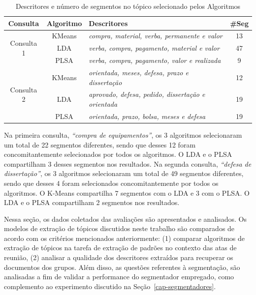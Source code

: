 \begin{table}[!h]
\begin{tabular}{|c|c|l|c|}
 \hline 
 \textbf{Consulta} &\textbf{Algoritmo }& \textbf{Descritores }& \textbf{\#Seg} \\ \hline
 \multirow{3}{*}{Consulta 1} &
 KMeans & \textit{compra, material, verba, permanente e valor} & 13 \\  \cline{2-4} 
 & LDA    & \textit{verba, compra, pagamento, material e valor}  & 47 \\  \cline{2-4}
 & PLSA   & \textit{verba, compra, pagamento, valor e realizada} & 9  \\  \hline 
 \multirow{3}{*}{Consulta 2} &
 KMeans & \textit{orientada, meses, defesa, prazo e dissertação} & 12 \\  \cline{2-4}
 & LDA    & \textit{aprovado, defesa, pedido, dissertação e orientada} & 19 \\ \cline{2-4} 
 & PLSA   & \textit{orientada, prazo, bolsa, meses e defesa} & 19 \\  \hline 
 \end{tabular}  
 \label{tab:segquanti}
 \caption{Descritores e número de segmentos no tópico selecionado pelos Algoritmos}
\end{table} 

Na primeira consulta, \textit{``compra de equipamentos''},  os 3 algoritmos selecionaram um total de 22 segmentos diferentes, sendo que desses 12 foram concomitantemente selecionados por todos os algoritmos. O LDA e o PLSA compartilham 3 desses segmentos nos resultados.
Na segunda  consulta, \textit{``defesa de dissertação''}, os 3 algoritmos selecionaram um total de 49 segmentos diferentes, sendo que desses 4 foram selecionados concomitantemente por todos os algoritmos. O K-Means compartilha 7 segmentos com o LDA e 3 com o PLSA. O LDA e o PLSA compartilham 2 segmentos nos resultados.



Nessa seção, os dados coletados das avaliações são apresentados e analisados. Os modelos de extração de tópicos discutidos neste trabalho são comparados de acordo com os critérios mencionados anteriormente: 
(1) comparar algoritmos de extração de tópicos na tarefa de extração de padrões no contexto das atas de reunião, 
(2) analisar a qualidade dos descritores extraídos para recuperar os documentos dos grupos.
Além disso, as questões referentes à segmentação, são analisadas a fim de 
validar a performance do segmentador empregado, como complemento ao experimento discutido na Seção~\ref{cap-segmentadores}.


